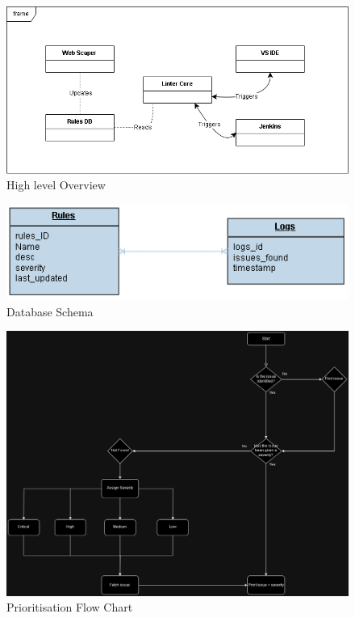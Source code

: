 \begin{figure}
    \centering
    \includegraphics[width=1\linewidth]{Figures/UML.png}
    \caption{High level Overview}
    \label{fig:enter-label}
\end{figure}

\begin{figure}
    \centering
    \includegraphics[width=1\linewidth]{Figures/database.drawio.png}
    \caption{Database Schema}
    \label{fig:enter-label}
\end{figure}
\begin{figure}
    \centering
    \includegraphics[width=1\linewidth]{Figures/prioritisation.drawio.png}
    \caption{Prioritisation Flow Chart}
    \label{fig:enter-label}
\end{figure}